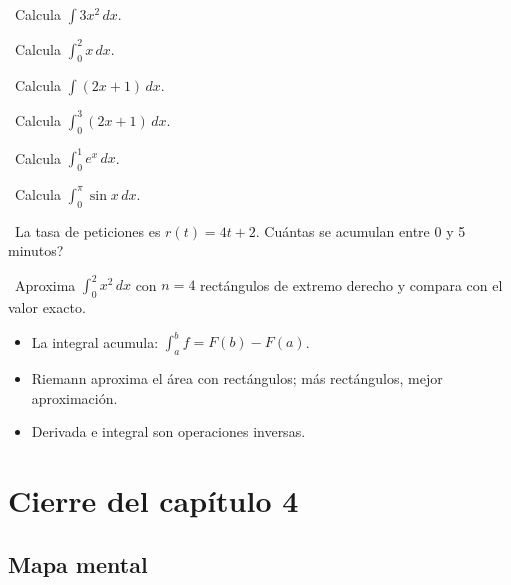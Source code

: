 \begin{tmejercicios}
\label{ej:4-5}
\begin{tmlista}
\item \tmbasico\ Calcula $\int3x^2\,dx$.
\item \tmbasico\ Calcula $\int_0^2x\,dx$.
\item \tmbasico\ Calcula $\int(2x+1)\,dx$.
\item \tmmedio\ Calcula $\int_0^3(2x+1)\,dx$.
\item \tmmedio\ Calcula $\int_0^1e^x\,dx$.
\item \tmmedio\ Calcula $\int_0^\pi\sin x\,dx$.
\item \tmdificil\ La tasa de peticiones es $r(t)=4t+2$. \textquestiondown Cu\'antas se acumulan entre 0 y 5 minutos?
\item \tmdificil\ Aproxima $\int_0^2x^2\,dx$ con $n=4$ rect\'angulos de extremo derecho y compara con el valor exacto.
\end{tmlista}
\end{tmejercicios}


\begin{tmresumen}
\begin{itemize}
\item La integral acumula: $\int_a^bf=F(b)-F(a)$.
\item Riemann aproxima el \'area con rect\'angulos; m\'as rect\'angulos, mejor aproximaci\'on.
\item Derivada e integral son operaciones inversas.
\end{itemize}
\end{tmresumen}

\clearpage
\section*{Cierre del cap\'itulo 4}
\subsection{Mapa mental}


